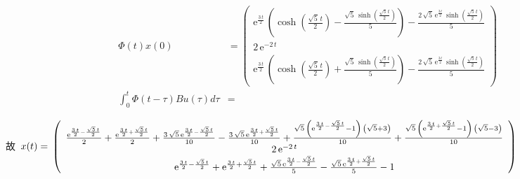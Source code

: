 \documentclass[a4paper]{article}
\begin{document}
\begin{align*}
\Phi(t)x(0) & = 
\left(\begin{array}{c} \mathrm{e}^{\frac{3\, t}{2}}\, \left(\cosh\!\left(\frac{\sqrt{5}\, t}{2}\right) - \frac{\sqrt{5}\, \sinh\!\left(\frac{\sqrt{5}\, t}{2}\right)}{5}\right) - \frac{2\, \sqrt{5}\, \mathrm{e}^{\frac{3\, t}{2}}\, \sinh\!\left(\frac{\sqrt{5}\, t}{2}\right)}{5} \\ 2\, \mathrm{e}^{- 2\, t}\\ \mathrm{e}^{\frac{3\, t}{2}}\, \left(\cosh\!\left(\frac{\sqrt{5}\, t}{2}\right) + \frac{\sqrt{5}\, \sinh\!\left(\frac{\sqrt{5}\, t}{2}\right)}{5}\right) - \frac{2\, \sqrt{5}\, \mathrm{e}^{\frac{3\, t}{2}}\, \sinh\!\left(\frac{\sqrt{5}\, t}{2}\right)}{5} \end{array}\right) \\
\int^{t}_{0}\Phi(t-\tau)Bu(\tau)d\tau & = 
\end{align*}

\mbox{故 }$ x(t)=\\
\left(\begin{array}{c} \frac{\mathrm{e}^{\frac{3\, t}{2} - \frac{\sqrt{5}\, t}{2}}}{2} + \frac{\mathrm{e}^{\frac{3\, t}{2} + \frac{\sqrt{5}\, t}{2}}}{2} + \frac{3\, \sqrt{5}\, \mathrm{e}^{\frac{3\, t}{2} - \frac{\sqrt{5}\, t}{2}}}{10} - \frac{3\, \sqrt{5}\, \mathrm{e}^{\frac{3\, t}{2} + \frac{\sqrt{5}\, t}{2}}}{10} + \frac{\sqrt{5}\, \left(\mathrm{e}^{\frac{3\, t}{2} - \frac{\sqrt{5}\, t}{2}} - 1\right)\, \left(\sqrt{5} + 3\right)}{10} + \frac{\sqrt{5}\, \left(\mathrm{e}^{\frac{3\, t}{2} + \frac{\sqrt{5}\, t}{2}} - 1\right)\, \left(\sqrt{5} - 3\right)}{10}\\ 2\, \mathrm{e}^{- 2\, t}\\ \mathrm{e}^{\frac{3\, t}{2} - \frac{\sqrt{5}\, t}{2}} + \mathrm{e}^{\frac{3\, t}{2} + \frac{\sqrt{5}\, t}{2}} + \frac{\sqrt{5}\, \mathrm{e}^{\frac{3\, t}{2} - \frac{\sqrt{5}\, t}{2}}}{5} - \frac{\sqrt{5}\, \mathrm{e}^{\frac{3\, t}{2} + \frac{\sqrt{5}\, t}{2}}}{5} - 1 \end{array}\right) $ \\
\end{document}
